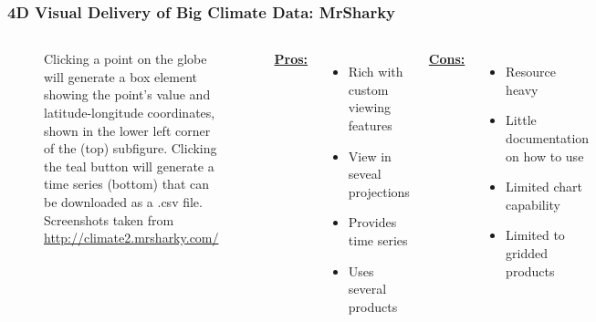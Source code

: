 \begin{frame}
\frametitle{4D Visual Delivery of Big Climate Data: MrSharky}
\begin{columns}
\begin{figure}
\vspace*{-.6cm}
\begin{minipage}{1\columnwidth}
\centering
{}
\caption{\tiny{Clicking a point on the globe will generate a box element showing the point's value and latitude-longitude coordinates, shown in the lower left corner of the (top) subfigure. Clicking the teal button will generate a time series (bottom) that can be downloaded as a .csv file. Screenshots taken from \url{http://climate2.mrsharky.com/}}}
\end{minipage}
\end{figure}
\small{\underline{\textbf{Pros:}}}
\begin{itemize}
    \item Rich with custom viewing features
    \item View in seveal projections
    \item Provides time series
    \item Uses several products
\end{itemize}
\small{\underline{\textbf{Cons:}}}
\begin{itemize}
    \item Resource heavy
    \item Little documentation on how to use
    \item Limited chart capability
    \item Limited to gridded products
\end{itemize}
\end{columns}
\end{frame}

